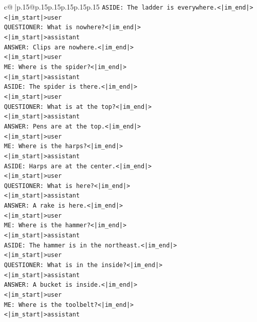 \documentclass{article}
\begin{document}
{\begin{supertabular}{c@{$\;$}|p{.15\linewidth}@{}p{.15\linewidth}p{.15\linewidth}p{.15\linewidth}p{.15\linewidth}p{.15\linewidth}}
{{{\texttt{ASIDE: The ladder is everywhere.<|im\_end|>} \\
\texttt{<|im\_start|>user} \\
\texttt{QUESTIONER: What is nowhere?<|im\_end|>} \\
\texttt{<|im\_start|>assistant} \\
\texttt{ANSWER: Clips are nowhere.<|im\_end|>} \\
\texttt{<|im\_start|>user} \\
\texttt{ME: Where is the spider?<|im\_end|>} \\
\texttt{<|im\_start|>assistant} \\
\texttt{ASIDE: The spider is there.<|im\_end|>} \\
\texttt{<|im\_start|>user} \\
\texttt{QUESTIONER: What is at the top?<|im\_end|>} \\
\texttt{<|im\_start|>assistant} \\
\texttt{ANSWER: Pens are at the top.<|im\_end|>} \\
\texttt{<|im\_start|>user} \\
\texttt{ME: Where is the harps?<|im\_end|>} \\
\texttt{<|im\_start|>assistant} \\
\texttt{ASIDE: Harps are at the center.<|im\_end|>} \\
\texttt{<|im\_start|>user} \\
\texttt{QUESTIONER: What is here?<|im\_end|>} \\
\texttt{<|im\_start|>assistant} \\
\texttt{ANSWER: A rake is here.<|im\_end|>} \\
\texttt{<|im\_start|>user} \\
\texttt{ME: Where is the hammer?<|im\_end|>} \\
\texttt{<|im\_start|>assistant} \\
\texttt{ASIDE: The hammer is in the northeast.<|im\_end|>} \\
\texttt{<|im\_start|>user} \\
\texttt{QUESTIONER: What is in the inside?<|im\_end|>} \\
\texttt{<|im\_start|>assistant} \\
\texttt{ANSWER: A bucket is inside.<|im\_end|>} \\
\texttt{<|im\_start|>user} \\
\texttt{ME: Where is the toolbelt?<|im\_end|>} \\
\texttt{<|im\_start|>assistant} \\
}}}
\end{supertabular}}
\end{document}
